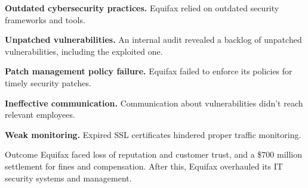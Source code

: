 
\begin{lettered}
\item \textbf{Outdated cybersecurity practices.} Equifax relied on outdated
security frameworks and tools.
\item \textbf{Unpatched vulnerabilities.} An internal audit revealed a backlog of
unpatched vulnerabilities, including the exploited one.
\item \textbf{Patch management policy failure.} Equifax failed to enforce its
policies for timely security patches.
\item \textbf{Ineffective communication.} Communication about vulnerabilities
didn't reach relevant employees.
\item \textbf{Weak monitoring.} Expired SSL certificates hindered proper traffic
monitoring.
\end{lettered}

\begin{ornotebox}{Outcome}
Equifax faced loss of reputation and customer trust, and a \$700 million
settlement for fines and compensation. After this, Equifax overhauled its IT
security systems and management.
\end{ornotebox}

